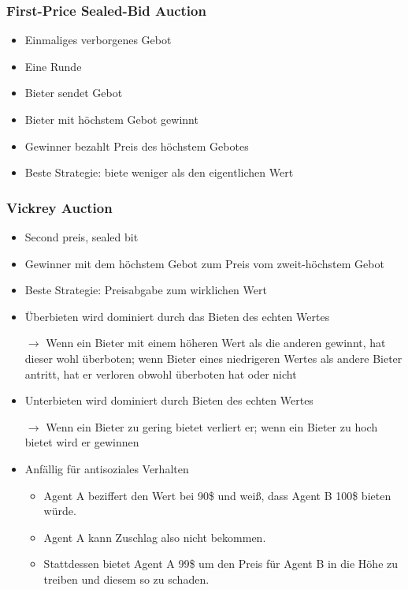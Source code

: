\documentclass{article} %
\begin{document}
	\subsubsection{First-Price Sealed-Bid Auction}
	\begin{itemize}
		\item Einmaliges verborgenes Gebot
		\item Eine Runde
		\item Bieter sendet Gebot
		\item Bieter mit höchstem Gebot gewinnt
		\item Gewinner bezahlt Preis des höchstem Gebotes
		\item Beste Strategie: biete weniger als den eigentlichen Wert
	\end{itemize}
	\subsubsection{Vickrey Auction}
	\begin{itemize}
		\item Second preis, sealed bit
		\item Gewinner mit dem höchstem Gebot zum Preis vom zweit-höchstem Gebot
		\item Beste Strategie: Preisabgabe zum wirklichen Wert
		\item Überbieten wird dominiert durch das Bieten des echten Wertes
		\item[$\rightarrow$] Wenn ein Bieter mit einem höheren Wert als die anderen gewinnt, hat dieser wohl überboten; wenn Bieter eines niedrigeren Wertes als andere Bieter antritt, hat er verloren obwohl überboten hat oder nicht
		\item Unterbieten wird dominiert durch Bieten des echten Wertes
		\item[$\rightarrow$] Wenn ein Bieter zu gering bietet verliert er; wenn ein Bieter zu hoch bietet wird er gewinnen
		\item Anfällig für antisoziales Verhalten
		\begin{itemize}
			\item Agent A beziffert den Wert bei 90\$ und weiß, dass Agent B 100\$ bieten würde.
			\item Agent A kann Zuschlag also nicht bekommen.
			\item Stattdessen bietet Agent A 99\$ um den Preis für Agent B in die Höhe zu treiben und diesem so zu schaden.
		\end{itemize}
	\end{itemize}
\end{document}
